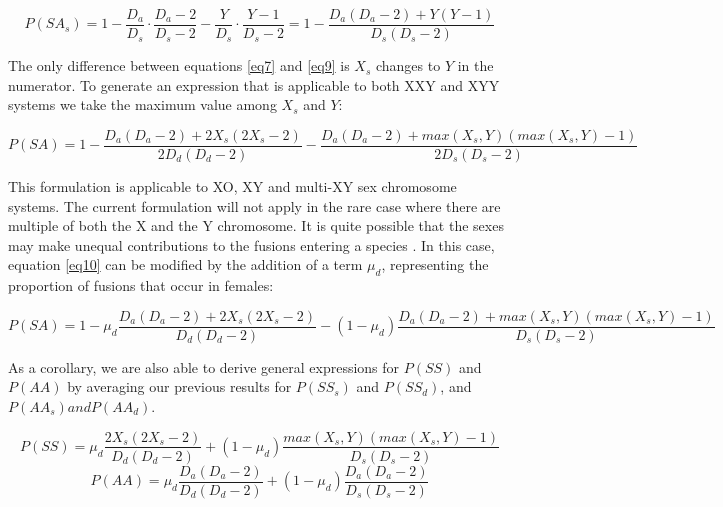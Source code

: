 \documentclass[12pt]{article}
\begin{document}
    \begin{equation} \label{eq9}
        P(SA_s) = 1 - \frac{D_a}{D_s} \cdot \frac{D_a - 2}{D_s - 2} - \frac{Y}{D_s} \cdot \frac{Y - 1}{D_s - 2} = 1 - \frac{D_a(D_a - 2) + Y(Y - 1)}{D_s(D_s - 2)}
    \end{equation}
    
The only difference between equations \ref{eq7} and \ref{eq9} is $X_s$ changes to $Y$ in the numerator. 
To generate an expression that is applicable to both XXY and XYY systems we take the maximum value among $X_s$ and $Y$:

    \begin{equation} \label{eq10}
        P(SA) = 1 -\frac{D_a(D_a-2) + 2X_s(2X_s-2)}{2D_d(D_d-2)} - \frac{D_a(D_a - 2) + max(X_s,Y)(max(X_s,Y)-1)}{2D_s(D_s-2)}
    \end{equation}

This formulation is applicable to XO, XY and multi-XY sex chromosome systems.
The current formulation will not apply in the rare case where there are multiple of both the X and the Y chromosome.
It is quite possible that the sexes may make unequal contributions to the fusions entering a species \citep{pennell2015}.
In this case, equation \ref{eq10} can be modified by the addition of a term $\mu_d$, representing the proportion of fusions that occur in females:

\small
    \begin{equation} \label{eq11}
        P(SA) = 1 -\mu_d\frac{D_a(D_a-2) + 2X_s(2X_s-2)}{D_d(D_d-2)} - (1-\mu_d)\frac{D_a(D_a - 2) + max(X_s,Y)(max(X_s,Y)-1)}{D_s(D_s-2)}
    \end{equation}
\normalsize

As a corollary, we are also able to derive general expressions for $P(SS)$ and $P(AA)$ by averaging our previous results for $P(SS_s)$ and $P(SS_d)$, and $P(AA_s) and P(AA_d)$.

\begin{equation} \label{eq12}
    P(SS) = \mu_d\frac{2X_s(2X_s - 2)}{D_d(D_d-2)} + (1-\mu_d)\frac{max(X_s,Y)(max(X_s,Y) - 1)}{D_s(D_s-2)}
\end{equation}
\begin{equation} \label{eq13}
    P(AA) = \mu_d\frac{D_a(D_a-2)}{D_d(D_d-2)} + (1-\mu_d)\frac{D_a(D_a-2)}{D_s(D_s-2)}
\end{equation}
\end{document}
